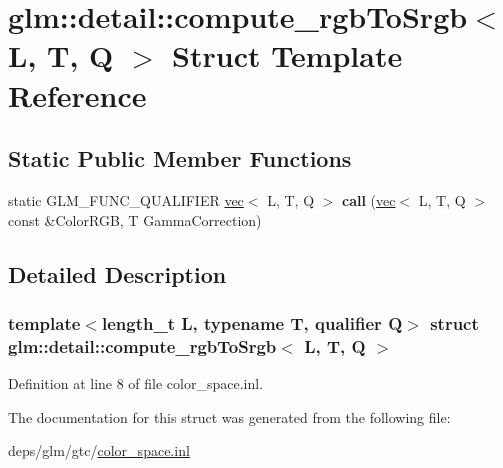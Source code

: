 \hypertarget{structglm_1_1detail_1_1compute__rgbToSrgb}{}\section{glm\+:\+:detail\+:\+:compute\+\_\+rgb\+To\+Srgb$<$ L, T, Q $>$ Struct Template Reference}
\label{structglm_1_1detail_1_1compute__rgbToSrgb}
\subsection*{Static Public Member Functions}
\begin{DoxyCompactItemize}
\item 
\mbox{\label{structglm_1_1detail_1_1compute__rgbToSrgb_a80f1b6c28ca418cc3eaf661e6714d7b5}} 
static G\+L\+M\+\_\+\+F\+U\+N\+C\+\_\+\+Q\+U\+A\+L\+I\+F\+I\+ER \hyperlink{structglm_1_1vec}{vec}$<$ L, T, Q $>$ {\bfseries call} (\hyperlink{structglm_1_1vec}{vec}$<$ L, T, Q $>$ const \&Color\+R\+GB, T Gamma\+Correction)
\end{DoxyCompactItemize}


\subsection{Detailed Description}
\subsubsection*{template$<$length\+\_\+t L, typename T, qualifier Q$>$\newline
struct glm\+::detail\+::compute\+\_\+rgb\+To\+Srgb$<$ L, T, Q $>$}



Definition at line 8 of file color\+\_\+space.\+inl.



The documentation for this struct was generated from the following file\+:\begin{DoxyCompactItemize}
\item 
deps/glm/gtc/\hyperlink{gtc_2color__space_8inl}{color\+\_\+space.\+inl}\end{DoxyCompactItemize}
